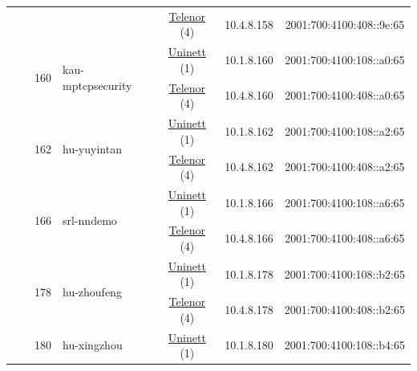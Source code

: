 \begin{small}
\begin{center}
\begin{longtable}{|c|c|c|c|c|c|c|c|}
  &  &  &  & \multicolumn{2}{|c|}{\tiny{\href{https://www.telenor.no}{Telenor} (4)}} & \tiny{10.4.8.158} & \tiny{2001:700:4100:408::9e:65} \\* \cline{3-3}\cline{4-4}\cline{5-5}\cline{6-6}\cline{7-7}\cline{8-8}
  &  & \multirow{2}{*}{\tiny{160}} & \multicolumn{1}{|l|}{\multirow{2}{*}{\tiny{kau-mptcpsecurity}}} & \multicolumn{2}{|c|}{\tiny{\href{https://www.uninett.no}{Uninett} (1)}} & \tiny{10.1.8.160} & \tiny{2001:700:4100:108::a0:65} \\* \cline{5-5}\cline{6-6}\cline{7-7}\cline{8-8}
  &  &  &  & \multicolumn{2}{|c|}{\tiny{\href{https://www.telenor.no}{Telenor} (4)}} & \tiny{10.4.8.160} & \tiny{2001:700:4100:408::a0:65} \\* \cline{3-3}\cline{4-4}\cline{5-5}\cline{6-6}\cline{7-7}\cline{8-8}
  &  & \multirow{2}{*}{\tiny{162}} & \multicolumn{1}{|l|}{\multirow{2}{*}{\tiny{hu-yuyintan}}} & \multicolumn{2}{|c|}{\tiny{\href{https://www.uninett.no}{Uninett} (1)}} & \tiny{10.1.8.162} & \tiny{2001:700:4100:108::a2:65} \\* \cline{5-5}\cline{6-6}\cline{7-7}\cline{8-8}
  &  &  &  & \multicolumn{2}{|c|}{\tiny{\href{https://www.telenor.no}{Telenor} (4)}} & \tiny{10.4.8.162} & \tiny{2001:700:4100:408::a2:65} \\* \cline{3-3}\cline{4-4}\cline{5-5}\cline{6-6}\cline{7-7}\cline{8-8}
  &  & \multirow{2}{*}{\tiny{166}} & \multicolumn{1}{|l|}{\multirow{2}{*}{\tiny{srl-nndemo}}} & \multicolumn{2}{|c|}{\tiny{\href{https://www.uninett.no}{Uninett} (1)}} & \tiny{10.1.8.166} & \tiny{2001:700:4100:108::a6:65} \\* \cline{5-5}\cline{6-6}\cline{7-7}\cline{8-8}
  &  &  &  & \multicolumn{2}{|c|}{\tiny{\href{https://www.telenor.no}{Telenor} (4)}} & \tiny{10.4.8.166} & \tiny{2001:700:4100:408::a6:65} \\* \cline{3-3}\cline{4-4}\cline{5-5}\cline{6-6}\cline{7-7}\cline{8-8}
  &  & \multirow{2}{*}{\tiny{178}} & \multicolumn{1}{|l|}{\multirow{2}{*}{\tiny{hu-zhoufeng}}} & \multicolumn{2}{|c|}{\tiny{\href{https://www.uninett.no}{Uninett} (1)}} & \tiny{10.1.8.178} & \tiny{2001:700:4100:108::b2:65} \\* \cline{5-5}\cline{6-6}\cline{7-7}\cline{8-8}
  &  &  &  & \multicolumn{2}{|c|}{\tiny{\href{https://www.telenor.no}{Telenor} (4)}} & \tiny{10.4.8.178} & \tiny{2001:700:4100:408::b2:65} \\* \cline{3-3}\cline{4-4}\cline{5-5}\cline{6-6}\cline{7-7}\cline{8-8}
  &  & \multirow{2}{*}{\tiny{180}} & \multicolumn{1}{|l|}{\multirow{2}{*}{\tiny{hu-xingzhou}}} & \multicolumn{2}{|c|}{\tiny{\href{https://www.uninett.no}{Uninett} (1)}} & \tiny{10.1.8.180} & \tiny{2001:700:4100:108::b4:65} \\* \cline{5-5}\cline{6-6}\cline{7-7}\cline{8-8}

\end{longtable}
\end{center}
\end{small}
